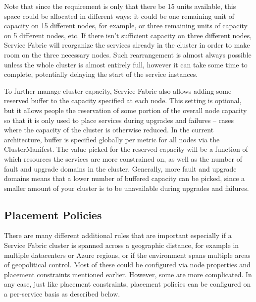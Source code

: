 Note that since the requirement is only that there be 15 units
available, this space could be allocated in different ways; it could
be one remaining unit of capacity on 15 different nodes, for example,
or three remaining units of capacity on 5 different nodes, etc. If
there isn’t sufficient capacity on three different nodes, Service
Fabric will reorganize the services already in the cluster in order to
make room on the three necessary nodes. Such rearrangement is almost
always possible unless the whole cluster is almost entirely full,
however it can take some time to complete, potentially delaying the
start of the service instances.

To further manage cluster capacity, Service Fabric also allows adding
some reserved buffer to the capacity specified at each node. This
setting is optional, but it allows people the reservation of some
portion of the overall node capacity so that it is only used to place
services during upgrades and failures – cases where the capacity of
the cluster is otherwise reduced. In the current architecture, buffer
is specified globally per metric for all nodes via the
ClusterManifest. The value picked for the reserved capacity will be a
function of which resources the services are more constrained on, as
well as the number of fault and upgrade domains in the
cluster. Generally, more fault and upgrade domains means that a lower
number of buffered capacity can be picked, since a smaller amount of
your cluster is to be unavailable during upgrades and failures.

\subsection{Placement Policies}
There are many different additional rules that are important
especially if a Service Fabric cluster is spanned across a geographic
distance, for example in multiple datacenters or Azure regions, or if the
environment spans multiple areas of geopolitical control. Most of these
could be configured via node properties and placement constraints
mentioned earlier. However, some are more complicated. In any case,
just like placement constraints, placement policies can be configured
on a per-service basis as described below.

